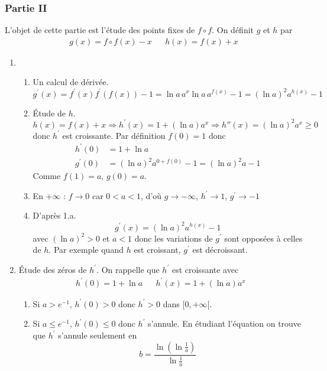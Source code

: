 \subsubsection*{Partie II}
L'objet de cette partie est l'étude des points fixes de $f\circ f$. On définit $g$ et $h$ par
\begin{align*}
 g(x)=f\circ f(x)-x & & h(x)=f(x)+x
\end{align*}
\begin{enumerate}
\item \begin{enumerate}
\item Un calcul de dérivée.
\[
g^\prime (x)=f^\prime(x)f^\prime(f(x))-1=\ln a\,a^x \ln a \, a^{f(x)}-1 = (\ln a)^2a^{h(x)}-1
\]
\item \'Etude de $h$.
\[h(x)=f(x)+x \Rightarrow h^\prime(x)=1+(\ln a)a^x \Rightarrow h''(x)=(\ln a)^2a^x \geq 0\]
donc $h^\prime$ est croissante.
Par définition $f(0)=1$ donc
\begin{align*}
 h^\prime (0) &= 1+\ln a \\
 g^\prime (0) &=(\ln a)^2a^{0+f(0)}-1=(\ln a)^2a-1
\end{align*}
Comme $f(1)=a$, $g(0)=a$.
\item En $+\infty$ : $f\rightarrow 0$ car $0<a<1$, d'où $g\rightarrow -\infty$, $h^\prime \rightarrow 1$,  $g^\prime \rightarrow -1$ 
\item D'après 1.a.
\[g^\prime (x)=(\ln a)^2 a^{h(x)}-1\]
avec $(\ln a)^2>0$ et $a<1$ donc les variations de $g^\prime$ sont opposées à celles de $h$. Par exemple quand $h$ est croissant, $g^\prime$ est décroissant.
\end{enumerate}
\item \'Etude des zéros de $h^\prime$. On rappelle que $h^\prime$ est croissante avec 
\begin{align*}
h^\prime(0)=1+\ln a &  &  h^\prime (x)=1+(\ln a) a^x
\end{align*}
\begin{enumerate}
\item Si $a>e^{-1}$, $h^\prime(0)>0$ donc $h^\prime>0$ dans $[0,+\infty[$.
\item Si $a\leq e^{-1}$, $h^\prime(0)\leq 0$ donc $h^\prime$ s'annule. En étudiant l'équation on trouve que $h^\prime$ s'annule seulement en
\[
b=\frac{\ln (\ln \frac{1}{a})}{\ln \frac{1}{a}}
\]


\end{enumerate}
\end{enumerate}
